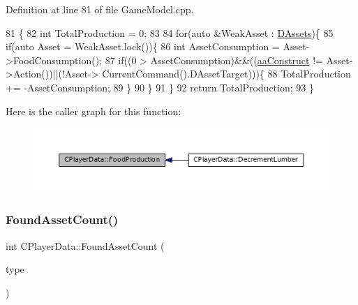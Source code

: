 Definition at line 81 of file Game\+Model.\+cpp.


\begin{DoxyCode}
81                                      \{
82     \textcolor{keywordtype}{int} TotalProduction = 0;
83     
84     \textcolor{keywordflow}{for}(\textcolor{keyword}{auto} &WeakAsset : \hyperlink{classCPlayerData_a1d7dd355facf52db6242e3554373906c}{DAssets})\{
85         \textcolor{keywordflow}{if}(\textcolor{keyword}{auto} Asset = WeakAsset.lock())\{
86             \textcolor{keywordtype}{int} AssetConsumption = Asset->FoodConsumption();
87             \textcolor{keywordflow}{if}((0 > AssetConsumption)&&((\hyperlink{GameDataTypes_8h_ab47668e651a3032cfb9c40ea2d60d670a7ef6b863f66dd7dcc95a199cd758ae1d}{aaConstruct} != Asset->Action())||(!Asset->
      CurrentCommand().DAssetTarget)))\{
88                 TotalProduction += -AssetConsumption;
89             \}
90         \}
91     \}
92     \textcolor{keywordflow}{return} TotalProduction;
93 \}
\end{DoxyCode}
Here is the caller graph for this function\+:\nopagebreak
\begin{figure}[H]
\begin{center}
\leavevmode
\includegraphics[width=350pt]{classCPlayerData_ae71ad19439d31ba0eb7f59809885ed6d_icgraph}
\end{center}
\end{figure}
\hypertarget{classCPlayerData_ac81c0899651bf3f9962b03ef0d7a2415}{}\label{classCPlayerData_ac81c0899651bf3f9962b03ef0d7a2415} 
\subsubsection{\texorpdfstring{Found\+Asset\+Count()}{FoundAssetCount()}}
{\footnotesize\ttfamily int C\+Player\+Data\+::\+Found\+Asset\+Count (\begin{DoxyParamCaption}\item[{\hyperlink{GameDataTypes_8h_a5600d4fc433b83300308921974477fec}{E\+Asset\+Type}}]{type }\end{DoxyParamCaption})}



